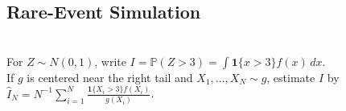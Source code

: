 \subsection{Rare-Event Simulation}

\begin{example} \label{ex:tail-probability-importance-sampling} \\
For $Z\sim N(0,1)$, write $I=\mathbb{P}(Z>3)=\int \mathbf{1}\{x>3\}f(x)\,dx$.\\
If $g$ is centered near the right tail and $X_1,\ldots,X_N\sim g$, estimate $I$ by $\widehat{I}_N=N^{-1}\sum\limits_{i=1}^{N}\frac{\mathbf{1}\{X_i>3\}f(X_i)}{g(X_i)}$.
\end{example}
